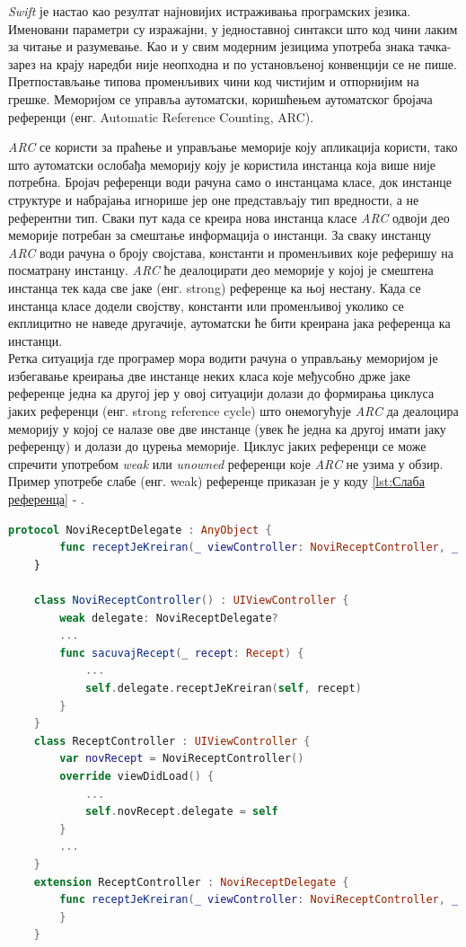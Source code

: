 \documentclass[12pt,oneside]{memoir}
\begin{document}
\indent \textit{Swift} је настао као резултат најновијих истраживања програмских језика.
Именовани параметри су изражајни, у једноставној синтакси што код чини лаким за читање и разумевање. Као и у свим модерним језицима употреба знака тачка-зарез на крају наредби није неопходна и по установљеној конвенцији се не пише. Претпостављање типова променљивих чини код чистијим и отпорнијим на грешке. Меморијом се управља аутоматски, коришћењем аутоматског бројача референци (енг. Automatic Reference Counting, ARC).

\indent \textit{ARC} се користи за праћење и управљање меморије коју апликација користи, тако што аутоматски ослобађа меморију коју је користила инстанца која више није потребна. Бројач референци води рачуна само о инстанцама класе, док инстанце структуре и набрајања игнорише јер оне представљају тип вредности, а не референтни тип. Сваки пут када се креира нова инстанца класе \textit{ARC} одвоји део меморије потребан за смештање информација о инстанци. За сваку инстанцу \textit{ARC} води рачуна о броју својстава, константи и променљивих које реферишу на посматрану инстанцу. \textit{ARC} ће деалоцирати део меморије у којој је смештена инстанца тек када све јаке (енг. strong) референце ка њој нестану. Када се инстанца класе додели својству, константи или променљивој уколико се екплицитно не наведе другачије, аутоматски ће бити креирана јака референца ка инстанци. \\
\indent Ретка ситуација где програмер мора водити рачуна о управљању меморијом је избегавање креирања две инстанце неких класа које међусобно држе јаке референце једна ка другој јер у овој ситуацији долази до формирања циклуса јаких референци (енг. strong reference cycle) што онемогућује \textit{ARC} да деалоцира меморију у којој се налазе ове две инстанце (увек ће једна ка другој имати јаку референцу) и долази до цурења меморије. Циклус јаких референци се може спречити употребом \textit{weak} или \textit{unowned} референци које \textit{ARC} не узима у обзир. Пример употребе слабе (енг. weak) референце приказан је у коду \ref{lst:Слаба референца} - .

\begin{lstlisting}[caption=\textit{{Слаба референца}}, label={lst:Слаба референца}, language=Swift, frame=single]
    protocol NoviReceptDelegate : AnyObject {
        func receptJeKreiran(_ viewController: NoviReceptController, _ recept: Recept)
    }
    
    class NoviReceptController() : UIViewController {
        weak delegate: NoviReceptDelegate?
        ...
        func sacuvajRecept(_ recept: Recept) {
            ...
            self.delegate.receptJeKreiran(self, recept)
        }
    }
    class ReceptController : UIViewController {
        var novRecept = NoviReceptController()
        override viewDidLoad() {
            ...
            self.novRecept.delegate = self
        }
        ...
    }
    extension ReceptController : NoviReceptDelegate {
        func receptJeKreiran(_ viewController: NoviReceptController, _ recept: Recept) {
        }
    }
\end{lstlisting}
\end{document}
